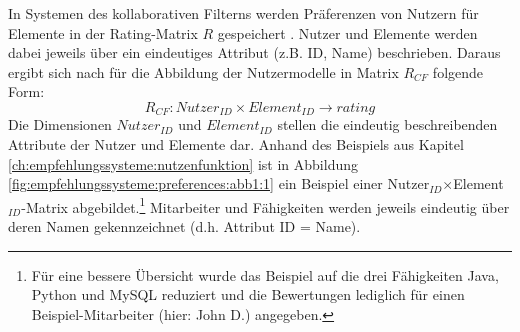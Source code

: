 In Systemen des kollaborativen Filterns werden Präferenzen von Nutzern für Elemente in der Rating-Matrix $R$ gespeichert \cite[S. 246ff.]{berkovsky:article}.
Nutzer und Elemente werden dabei jeweils über ein eindeutiges Attribut (z.B. ID, Name) beschrieben.
Daraus ergibt sich nach \textcite[S. 250]{berkovsky:article} für die Abbildung der Nutzermodelle in Matrix $R_{CF}$ folgende Form:
\begin{equation}\label{eq5}
    R_{CF}: Nutzer_{ID} \times Element_{ID} \rightarrow rating
\end{equation}
Die Dimensionen $Nutzer_{ID}$ und $Element_{ID}$ stellen die eindeutig beschreibenden Attribute der Nutzer und Elemente dar.
Anhand des Beispiels aus Kapitel \ref{ch:empfehlungssysteme:nutzenfunktion} ist in Abbildung \ref{fig:empfehlungssysteme:preferences:abb1:1} ein Beispiel einer Nutzer$_{ID}$$\times$Element$_{ID}$-Matrix abgebildet.\footnote{Für eine bessere Übersicht wurde das Beispiel auf die drei Fähigkeiten Java, Python und MySQL reduziert und die Bewertungen lediglich für einen Beispiel-Mitarbeiter (hier: John D.) angegeben.}
Mitarbeiter und Fähigkeiten werden jeweils eindeutig über deren Namen gekennzeichnet (d.h. Attribut ID = Name).

